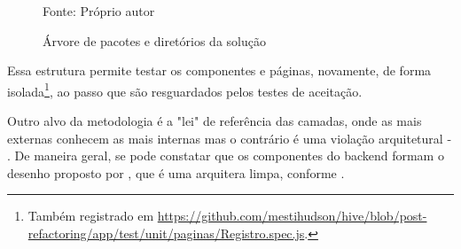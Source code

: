   \begin{figure}[htb!]
    \centering
    \caption{Árvore de pacotes e diretórios da solução}
    \small{Fonte: Próprio autor}
  \end{figure}

  Essa estrutura permite testar os componentes e páginas, novamente, de forma isolada\footnote{Também registrado em \url{https://github.com/mestihudson/hive/blob/post-refactoring/app/test/unit/paginas/Registro.spec.js}.}, ao passo que são resguardados pelos testes de aceitação.

  Outro alvo da metodologia é a "lei" de referência das camadas, onde as mais externas conhecem as mais internas mas o contrário é uma violação arquitetural - . De maneira geral, se pode constatar que os componentes do backend formam o desenho proposto por , que é uma arquitera limpa, conforme .
